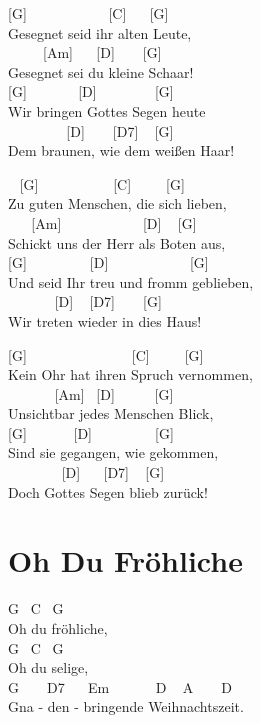 \documentclass[
  letterpaper,
]{scrbook}
\begin{document}
{[}G{]} ~ ~ ~ ~ ~ ~ ~{[}C{]} ~ ~{[}G{]}\\
Gesegnet seid ihr alten Leute,\\
\hspace*{0.333em} ~ ~ ~ {[}Am{]} ~ ~{[}D{]} ~ ~ {[}G{]}\\
Gesegnet sei du kleine Schaar!\\
{[}G{]} ~ ~ ~ ~ {[}D{]} ~ ~ ~ ~ ~{[}G{]}\\
Wir bringen Gottes Segen heute\\
\hspace*{0.333em} ~ ~ ~ ~ ~ {[}D{]} ~ ~ {[}D7{]} ~ {[}G{]}\\
Dem braunen, wie dem weißen Haar!

~ {[}G{]} ~ ~ ~ ~ ~ ~ {[}C{]} ~ ~ ~{[}G{]}\\
Zu guten Menschen, die sich lieben,\\
\hspace*{0.333em} ~ ~ {[}Am{]} ~ ~ ~ ~ ~ ~ ~{[}D{]} ~ {[}G{]}\\
Schickt uns der Herr als Boten aus,\\
{[}G{]} ~ ~ ~ ~ ~ {[}D{]} ~ ~ ~ ~ ~ ~ ~{[}G{]}\\
Und seid Ihr treu und fromm geblieben,\\
\hspace*{0.333em} ~ ~ ~ ~ {[}D{]} ~ {[}D7{]} ~ ~ {[}G{]}\\
Wir treten wieder in dies Haus!

{[}G{]} ~ ~ ~ ~ ~ ~ ~ ~ ~{[}C{]} ~ ~ ~{[}G{]}\\
Kein Ohr hat ihren Spruch vernommen,\\
\hspace*{0.333em} ~ ~ ~ ~ {[}Am{]} ~{[}D{]} ~ ~ ~ {[}G{]}\\
Unsichtbar jedes Menschen Blick,\\
{[}G{]} ~ ~ ~ ~{[}D{]} ~ ~ ~ ~ ~ {[}G{]}\\
Sind sie gegangen, wie gekommen,\\
\hspace*{0.333em} ~ ~ ~ ~ ~{[}D{]} ~ ~{[}D7{]} ~ {[}G{]}\\
Doch Gottes Segen blieb zurück!

\hypertarget{oh-du-fruxf6hliche}{%
\chapter{Oh Du Fröhliche}\label{oh-du-fruxf6hliche}}

G ~C ~G\\
Oh du fröhliche,\\
G ~C ~G\\
Oh du selige,\\
G ~ ~ D7 ~ ~Em ~ ~ ~ ~D ~ A ~ ~ D\\
Gna - den - bringende Weihnachtszeit.
\end{document}
